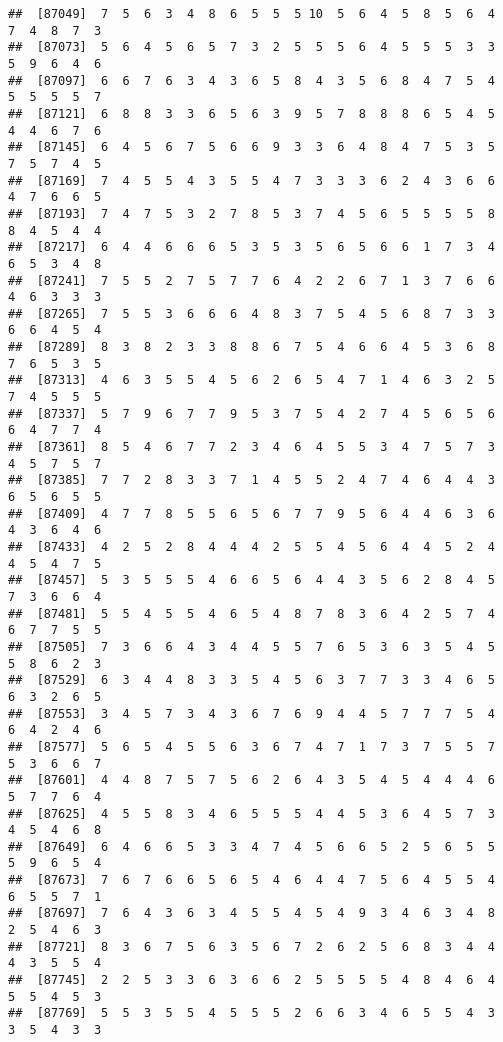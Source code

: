 \documentclass[
]{book}
\begin{document}
\begin{verbatim}
##  [87049]  7  5  6  3  4  8  6  5  5  5 10  5  6  4  5  8  5  6  4  7  4  8  7  3
##  [87073]  5  6  4  5  6  5  7  3  2  5  5  5  6  4  5  5  5  3  3  5  9  6  4  6
##  [87097]  6  6  7  6  3  4  3  6  5  8  4  3  5  6  8  4  7  5  4  5  5  5  5  7
##  [87121]  6  8  8  3  3  6  5  6  3  9  5  7  8  8  8  6  5  4  5  4  4  6  7  6
##  [87145]  6  4  5  6  7  5  6  6  9  3  3  6  4  8  4  7  5  3  5  7  5  7  4  5
##  [87169]  7  4  5  5  4  3  5  5  4  7  3  3  3  6  2  4  3  6  6  4  7  6  6  5
##  [87193]  7  4  7  5  3  2  7  8  5  3  7  4  5  6  5  5  5  5  8  8  4  5  4  4
##  [87217]  6  4  4  6  6  6  5  3  5  3  5  6  5  6  6  1  7  3  4  6  5  3  4  8
##  [87241]  7  5  5  2  7  5  7  7  6  4  2  2  6  7  1  3  7  6  6  4  6  3  3  3
##  [87265]  7  5  5  3  6  6  6  4  8  3  7  5  4  5  6  8  7  3  3  6  6  4  5  4
##  [87289]  8  3  8  2  3  3  8  8  6  7  5  4  6  6  4  5  3  6  8  7  6  5  3  5
##  [87313]  4  6  3  5  5  4  5  6  2  6  5  4  7  1  4  6  3  2  5  7  4  5  5  5
##  [87337]  5  7  9  6  7  7  9  5  3  7  5  4  2  7  4  5  6  5  6  6  4  7  7  4
##  [87361]  8  5  4  6  7  7  2  3  4  6  4  5  5  3  4  7  5  7  3  4  5  7  5  7
##  [87385]  7  7  2  8  3  3  7  1  4  5  5  2  4  7  4  6  4  4  3  6  5  6  5  5
##  [87409]  4  7  7  8  5  5  6  5  6  7  7  9  5  6  4  4  6  3  6  4  3  6  4  6
##  [87433]  4  2  5  2  8  4  4  4  2  5  5  4  5  6  4  4  5  2  4  4  5  4  7  5
##  [87457]  5  3  5  5  5  4  6  6  5  6  4  4  3  5  6  2  8  4  5  7  3  6  6  4
##  [87481]  5  5  4  5  5  4  6  5  4  8  7  8  3  6  4  2  5  7  4  6  7  7  5  5
##  [87505]  7  3  6  6  4  3  4  4  5  5  7  6  5  3  6  3  5  4  5  5  8  6  2  3
##  [87529]  6  3  4  4  8  3  3  5  4  5  6  3  7  7  3  3  4  6  5  6  3  2  6  5
##  [87553]  3  4  5  7  3  4  3  6  7  6  9  4  4  5  7  7  7  5  4  6  4  2  4  6
##  [87577]  5  6  5  4  5  5  6  3  6  7  4  7  1  7  3  7  5  5  7  5  3  6  6  7
##  [87601]  4  4  8  7  5  7  5  6  2  6  4  3  5  4  5  4  4  4  6  5  7  7  6  4
##  [87625]  4  5  5  8  3  4  6  5  5  5  4  4  5  3  6  4  5  7  3  4  5  4  6  8
##  [87649]  6  4  6  6  5  3  3  4  7  4  5  6  6  5  2  5  6  5  5  5  9  6  5  4
##  [87673]  7  6  7  6  6  5  6  5  4  6  4  4  7  5  6  4  5  5  4  6  5  5  7  1
##  [87697]  7  6  4  3  6  3  4  5  5  4  5  4  9  3  4  6  3  4  8  2  5  4  6  3
##  [87721]  8  3  6  7  5  6  3  5  6  7  2  6  2  5  6  8  3  4  4  4  3  5  5  4
##  [87745]  2  2  5  3  3  6  3  6  6  2  5  5  5  5  4  8  4  6  4  5  5  4  5  3
##  [87769]  5  5  3  5  5  4  5  5  5  2  6  6  3  4  6  5  5  4  3  3  5  4  3  3

\end{verbatim}
\end{document}
